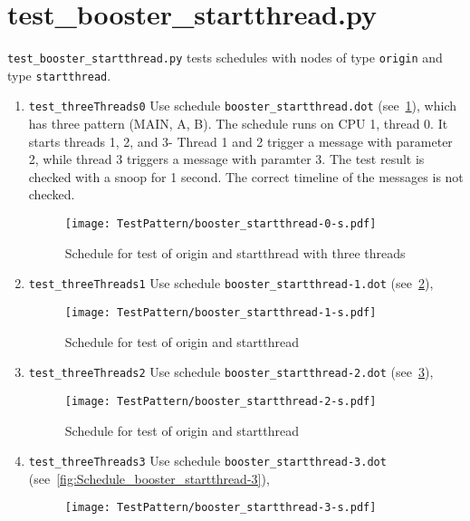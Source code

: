 \documentclass[12pt,a4paper]{report}
\begin{document}
\section{test\_booster\_startthread.py}
\texttt{test\_booster\_startthread.py} tests schedules with nodes of 
type \texttt{origin} and type \texttt{startthread}.
\begin{enumerate}
\item \texttt{test\_threeThreads0}
Use schedule \texttt{booster\_startthread.dot} (see~\ref{fig:Schedule_booster_startthread-0}),
which has three pattern (MAIN, A, B). The schedule runs on CPU 1, thread 0. 
It starts threads 1, 2, and 3- Thread 1 and 2 trigger a message with parameter 2, 
while thread 3 triggers a message with paramter 3. The test result is 
checked with a snoop for 1 second. The correct timeline of the messages 
is not checked.
    \begin{figure}
        \centering
        \texttt{[image: TestPattern/booster\_startthread-0-s.pdf]}
        \caption{Schedule for test of origin and startthread with three threads}
        \label{fig:Schedule_booster_startthread-0}
    \end{figure}
\item \texttt{test\_threeThreads1}
Use schedule \texttt{booster\_startthread-1.dot} (see~\ref{fig:Schedule_booster_startthread-1}), 
    \begin{figure}
        \centering
        \texttt{[image: TestPattern/booster\_startthread-1-s.pdf]}
        \caption{Schedule for test of origin and startthread}
        \label{fig:Schedule_booster_startthread-1}
    \end{figure}
\item \texttt{test\_threeThreads2}
Use schedule \texttt{booster\_startthread-2.dot} (see~\ref{fig:Schedule_booster_startthread-2}), 
    \begin{figure}
        \centering
        \texttt{[image: TestPattern/booster\_startthread-2-s.pdf]}
        \caption{Schedule for test of origin and startthread}
        \label{fig:Schedule_booster_startthread-2}
    \end{figure}
\item \texttt{test\_threeThreads3}
Use schedule \texttt{booster\_startthread-3.dot} (see~\ref{fig:Schedule_booster_startthread-3}), 
    \begin{figure}
        \centering
        \texttt{[image: TestPattern/booster\_startthread-3-s.pdf]}

\end{figure}
\end{enumerate}
\end{document}
